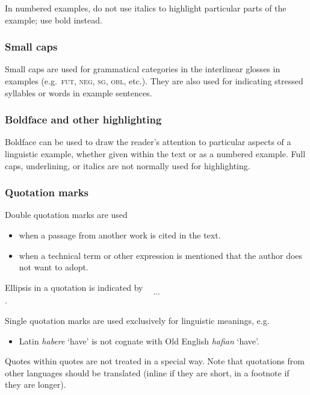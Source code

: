 \documentclass[cm,linguex]{glossa}
\providecommand{\tightlist}{%
  \setlength{\itemsep}{0pt}\setlength{\parskip}{0pt}}
\begin{document}
In numbered examples, do not use italics to highlight particular parts
of the example; use bold instead.

\hypertarget{small-caps}{%
\subsubsection{Small caps}\label{small-caps}}

Small caps are used for grammatical categories in the interlinear
glosses in examples (e.g.~\textsc{fut, neg, sg, obl}, etc.). They are
also used for indicating stressed syllables or words in example
sentences.

\hypertarget{boldface-and-other-highlighting}{%
\subsubsection{Boldface and other
highlighting}\label{boldface-and-other-highlighting}}

Boldface can be used to draw the reader's attention to particular
aspects of a linguistic example, whether given within the text or as a
numbered example. Full caps, underlining, or italics are not normally
used for highlighting.

\hypertarget{quotation-marks}{%
\subsubsection{Quotation marks}\label{quotation-marks}}

Double quotation marks are used

\begin{itemize}
\item
  when a passage from another work is cited in the text.
\item
  when a technical term or other expression is mentioned that the author
  does not want to adopt.
\end{itemize}

Ellipsis in a quotation is indicated by \[...\].

Single quotation marks are used exclusively for linguistic meanings,
e.g.

\begin{itemize}
\tightlist
\item
  Latin \emph{habere} `have' is not cognate with Old English
  \emph{hafian} `have'.
\end{itemize}

Quotes within quotes are not treated in a special way. Note that
quotations from other languages should be translated (inline if they are
short, in a footnote if they are longer).
\end{document}
